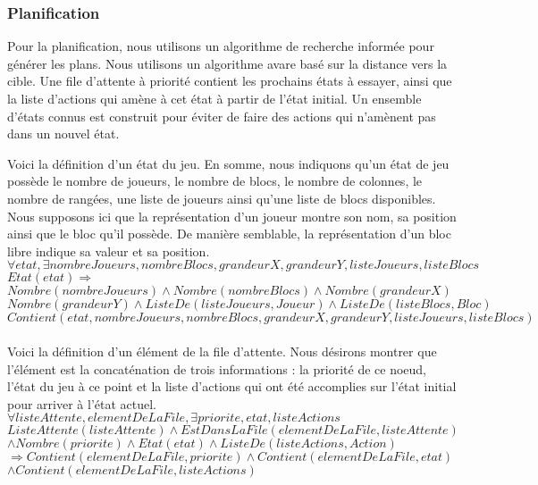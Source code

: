 \documentclass[12pt,letterpaper]{article}
\begin{document}
\subsubsection{Planification}
Pour la planification, nous utilisons un algorithme de recherche informée pour
générer les plans. Nous utilisons un algorithme avare basé sur la distance vers la cible.
Une file d'attente à priorité contient les prochains états à essayer, ainsi que la
liste d'actions qui amène à cet état à partir de l'état initial. Un ensemble d'états
connus est construit pour éviter de faire des actions qui n'amènent pas dans un
nouvel état.

Voici la définition d'un état du jeu. En somme, nous indiquons qu'un état de jeu possède le nombre de joueurs, le nombre de blocs, le nombre de colonnes, le nombre de rangées, une liste de joueurs ainsi qu'une liste de blocs disponibles. Nous supposons ici que la représentation d'un joueur montre son nom, sa position ainsi que le bloc qu'il possède. De manière semblable, la représentation d'un bloc libre indique sa valeur et sa position.
$ \forall etat, \exists nombreJoueurs, nombreBlocs, grandeurX, grandeurY, listeJoueurs, listeBlocs $ \\
$ Etat(etat) \Rightarrow $ \\
$ Nombre(nombreJoueurs) \wedge Nombre(nombreBlocs) \wedge Nombre(grandeurX) $ \\
$ Nombre(grandeurY) \wedge ListeDe(listeJoueurs, Joueur) \wedge ListeDe(listeBlocs, Bloc) $ \\
$ Contient(etat, nombreJoueurs, nombreBlocs, grandeurX, grandeurY, listeJoueurs, listeBlocs) $ \\
\\ %

Voici la définition d'un élément de la file d'attente. Nous désirons montrer que l'élément est la concaténation de trois informations : la priorité de ce noeud, l'état du jeu à ce point et la liste d'actions qui ont été accomplies sur l'état initial pour arriver à l'état actuel.
$ \forall listeAttente, elementDeLaFile, \exists priorite, etat, listeActions $ \\
$ ListeAttente(listeAttente) \wedge EstDansLaFile(elementDeLaFile, listeAttente) $ \\
$ \wedge Nombre(priorite) \wedge Etat(etat) \wedge ListeDe(listeActions, Action) $ \\
$ \Rightarrow Contient(elementDeLaFile, priorite) \wedge Contient(elementDeLaFile, etat) $ \\
$ \wedge Contient(elementDeLaFile, listeActions) $ \\
\\
\end{document}
